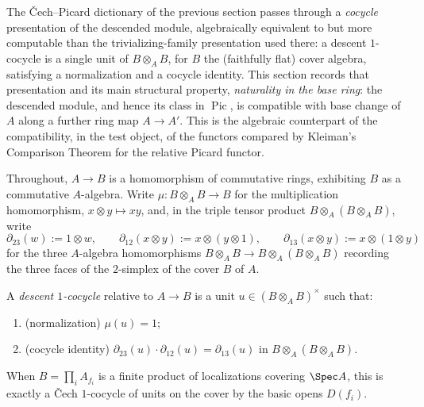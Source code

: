 The \v Cech--Picard dictionary of the previous section passes through a \emph{cocycle}
presentation of the descended module, algebraically equivalent to but more computable than
the trivializing-family presentation used there: a descent \(1\)-cocycle is a single unit of
\(B \otimes_A B\), for \(B\) the (faithfully flat) cover algebra, satisfying a normalization and
a cocycle identity. This section records that presentation and its main structural property,
\emph{naturality in the base ring}: the descended module, and hence its class in
\(\operatorname{Pic}\), is compatible with base change of \(A\) along a further ring map
\(A \to A'\). This is the algebraic counterpart of the compatibility, in the test object, of
the functors compared by Kleiman's Comparison Theorem for the relative Picard functor.

Throughout, \(A \to B\) is a homomorphism of commutative rings, exhibiting \(B\) as a
commutative \(A\)-algebra. Write \(\mu \colon B \otimes_A B \to B\) for the multiplication
homomorphism, \(x \otimes y \mapsto xy\), and, in the triple tensor product
\(B \otimes_A (B \otimes_A B)\), write
\[
  \partial_{23}(w) := 1 \otimes w, \qquad
  \partial_{12}(x \otimes y) := x \otimes (y \otimes 1), \qquad
  \partial_{13}(x \otimes y) := x \otimes (1 \otimes y)
\]
for the three \(A\)-algebra homomorphisms \(B \otimes_A B \to B \otimes_A (B \otimes_A B)\)
recording the three faces of the \(2\)-simplex of the cover \(B\) of \(A\).

\begin{definition}
  \label{pa-def:module_descent_cocycle}
  \leanok

  A \emph{descent \(1\)-cocycle} relative to \(A \to B\) is a unit \(u \in (B \otimes_A
  B)^{\times}\) such that:
  \begin{enumerate}
    \item (normalization) \(\mu(u) = 1\);
    \item (cocycle identity) \(\partial_{23}(u) \cdot \partial_{12}(u) = \partial_{13}(u)\) in
      \(B \otimes_A (B \otimes_A B)\).
  \end{enumerate}
  When \(B = \prod_i A_{f_i}\) is a finite product of localizations covering \(\Spec A\), this
  is exactly a \v Cech \(1\)-cocycle of units on the cover by the basic opens \(D(f_i)\).
\end{definition}

